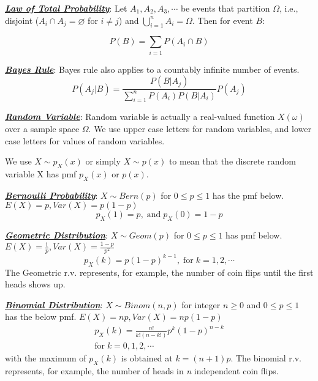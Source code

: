 \documentclass[12pt]{article}
\newcommand{\bulletPoint}[1]{\ul{\textit{\textbf{#1}}}}
\begin{document}
\singlespacing

\begin{multicols*}{4}

\tiny

\raggedright

\bulletPoint{Law of Total Probability}:
Let $A_1, A_2, A_3, \cdots$ be events that partition $\Omega$, i.e., disjoint ($A_i \cap A_j = \varnothing$ for $i\neq j$) and $\bigcup^{n}_{i=1} A_i = \Omega$. Then for event $B$:

\useshortskip \begin{equation*}
    P(B) = \sum_{i=1} P(A_i \cap B)
\end{equation*}


\bulletPoint{Bayes Rule}:
Bayes rule also applies to a countably infinite number of events.
\useshortskip \begin{equation*}
    P(A_j | B) = \frac{P(B | A_j)}{\sum^{n}_{i=1}P(A_i)P(B | A_i)} P(A_j)
\end{equation*}


\bulletPoint{Random Variable}:
Random variable is actually a real-valued function $X(\omega)$ over a sample space $\Omega$. We use upper case letters for random variables, and lower case letters for values of random variables.

We use $X \sim p_X(x)$ or simply $X \sim p(x)$ to mean that the discrete random variable X has pmf $p_X(x)$ or $p(x)$.


\bulletPoint{Bernoulli Probability}:
$X \sim Bern(p)$ for $0 \leq p \leq 1$ has the pmf below. $E(X)=p, Var(X)=p(1-p)$
\useshortskip \begin{equation*}
    p_X(1) = p, \; \text{and} \; p_X(0)=1-p
\end{equation*}


\bulletPoint{Geometric Distribution}:
$X \sim Geom(p)$ for $0 \leq p \leq 1$ has pmf below. $E(X)=\frac{1}{p}, Var(X)=\frac{1-p}{p^2}$
\useshortskip \begin{equation*}
    p_X(k) = p(1-p)^{k-1}, \; \text{for} \; k=1,2,\cdots
\end{equation*}
The Geometric r.v. represents, for example, the number of coin flips until the first heads shows up.


\bulletPoint{Binomial Distribution}:
$X \sim Binom(n, p)$ for  integer $n\geq 0$ and $0 \leq p \leq 1$ has the below pmf. $E(X)=np, Var(X)=np(1-p)$
\useshortskip \begin{equation*}
\begin{split}
        p_X(k) = \frac{n!}{k!(n-k!)} p^k (1-p)^{n-k} \\
        \text{for} \; k=0,1,2,\cdots
\end{split}
\end{equation*}
with the maximum of $p_X(k)$ is obtained at $k=(n+1)p$. The binomial r.v. represents, for example, the number of heads in \textit{n} independent coin flips.



\end{multicols*}
\end{document}
